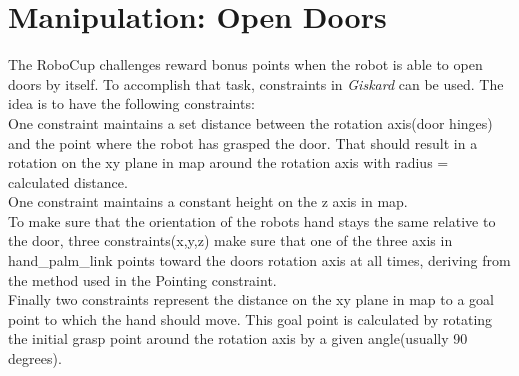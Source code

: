 \documentclass[main.tex]{subfiles}
\begin{document}
		\section{Manipulation: Open Doors}
		The RoboCup challenges reward bonus points when the robot is able to open doors by itself. To accomplish that task, constraints in \textit{Giskard} can be used. The idea is to have the following constraints:\\
		One constraint maintains a set distance between the rotation axis(door hinges) and the point where the robot has grasped the door. That should result in a rotation on the xy plane in map around the rotation axis with radius = calculated distance.\\
		One constraint maintains a constant height on the z axis in map.\\
		To make sure that the orientation of the robots hand stays the same relative to the door, three constraints(x,y,z) make sure that one of the three axis in hand\_palm\_link points toward the doors rotation axis at all times, deriving from the method used in the Pointing constraint.\\
		Finally two constraints represent the distance on the xy plane in map to a goal point to which the hand should move. This goal point is calculated by rotating the initial grasp point around the rotation axis by a given angle(usually 90 degrees).
		
		
		
	\endgroup
\end{document}
